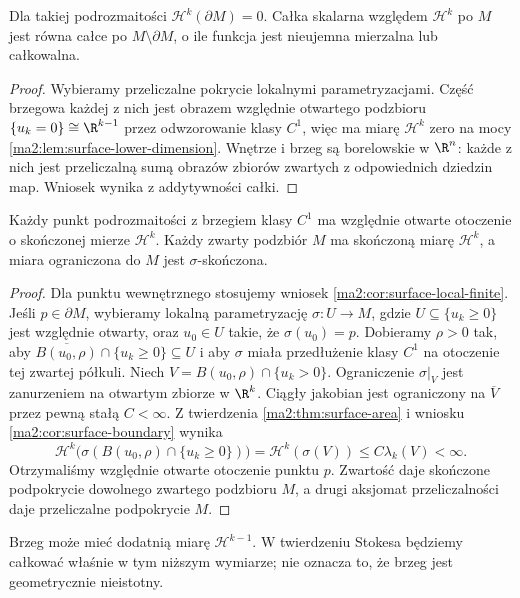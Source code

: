 \begin{wniosek}
\label{ma2:cor:surface-boundary}
Dla takiej podrozmaitości $\mathcal H^k(\partial M)=0$.
Całka skalarna względem $\mathcal H^k$ po $M$
jest równa całce po $M\setminus\partial M$,
o ile funkcja jest nieujemna mierzalna lub całkowalna.
\end{wniosek}
\begin{proof}
Wybieramy przeliczalne pokrycie lokalnymi
parametryzacjami. Część brzegowa każdej z nich
jest obrazem względnie otwartego podzbioru
$\{u_k=0\}\cong\R^{k-1}$ przez odwzorowanie
klasy $C^1$, więc ma miarę $\mathcal H^k$ zero
na mocy \ref{ma2:lem:surface-lower-dimension}.
Wnętrze i brzeg są borelowskie w $\R^n$:
każde z nich jest przeliczalną sumą obrazów
zbiorów zwartych z odpowiednich dziedzin map.
Wniosek wynika z addytywności całki.
\end{proof}
\begin{wniosek}
\label{ma2:cor:surface-boundary-local-finite}
Każdy punkt podrozmaitości z brzegiem klasy $C^1$
ma względnie otwarte otoczenie o skończonej
mierze $\mathcal H^k$. Każdy zwarty podzbiór
$M$ ma skończoną miarę $\mathcal H^k$,
a miara ograniczona do $M$ jest $\sigma$-skończona.
\end{wniosek}
\begin{proof}
Dla punktu wewnętrznego stosujemy wniosek
\ref{ma2:cor:surface-local-finite}.
Jeśli $p\in\partial M$, wybieramy lokalną
parametryzację $\sigma:U\to M$, gdzie
$U\subseteq\{u_k\ge0\}$ jest względnie otwarty,
oraz $u_0\in U$ takie, że $\sigma(u_0)=p$.
Dobieramy $\rho>0$ tak, aby
$\overline{B(u_0,\rho)}\cap\{u_k\ge0\}\subseteq U$
i aby $\sigma$ miała przedłużenie klasy $C^1$
na otoczenie tej zwartej półkuli.
Niech $V=B(u_0,\rho)\cap\{u_k>0\}$.
Ograniczenie $\sigma|_V$ jest zanurzeniem
na otwartym zbiorze w $\R^k$.
Ciągły jakobian jest ograniczony na
$\overline V$ przez pewną stałą $C<\infty$.
Z twierdzenia \ref{ma2:thm:surface-area} i wniosku
\ref{ma2:cor:surface-boundary} wynika
\[
 \mathcal H^k\bigl(\sigma(B(u_0,\rho)\cap\{u_k\ge0\})\bigr)
 =\mathcal H^k(\sigma(V))
 \le C\lambda_k(V)<\infty.
\]
Otrzymaliśmy względnie otwarte otoczenie punktu $p$.
Zwartość daje skończone podpokrycie dowolnego
zwartego podzbioru $M$, a drugi aksjomat
przeliczalności daje przeliczalne podpokrycie $M$.
\end{proof}

Brzeg może mieć dodatnią miarę $\mathcal H^{k-1}$.
W twierdzeniu Stokesa będziemy całkować właśnie
w tym niższym wymiarze; nie oznacza to, że brzeg
jest geometrycznie nieistotny.


